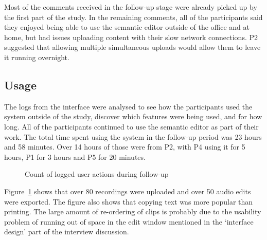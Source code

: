 Most of the comments received in the follow-up stage were already picked up by
the first part of the study. In the remaining comments, all of the participants
said they enjoyed being able to use the semantic editor outside of the office
and at home, but had issues uploading content with their slow network
connections. P2 suggested that allowing multiple simultaneous uploads would
allow them to leave it running overnight.

\subsection{Usage}
The logs from the interface were analysed to see how the participants used the
system outside of the study, discover which features were being used, and for
how long.
All of the participants continued to use the semantic editor as part of their
work. The total time spent using the system in the follow-up period was 23
hours and 58 minutes.  Over 14 hours of those were from P2, with P4 using it
for 5 hours, P1 for 3 hours and P5 for 20 minutes.

\begin{figure}
\centering
  \caption{Count of logged user actions during follow-up}
  \label{fig:actions}
\end{figure}

Figure~\ref{fig:actions} shows that over 80 recordings were uploaded and over
50 audio edits were exported. The figure also shows that copying text was more
popular than printing. The large amount of re-ordering of clips is probably due
to the usability problem of running out of space in the edit window mentioned
in the `interface design' part of the interview discussion.

